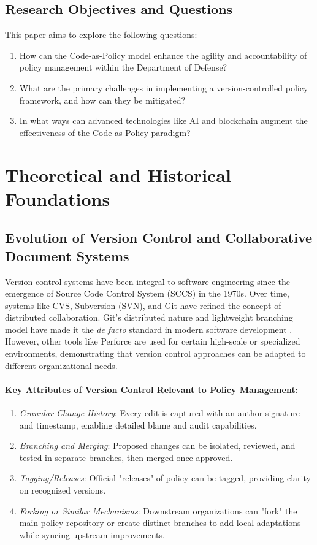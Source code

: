 \documentclass[11pt]{article}
\begin{document}
	\subsection{Research Objectives and Questions}
	This paper aims to explore the following questions:
	\begin{enumerate}
		\item How can the Code-as-Policy model enhance the agility and accountability of policy management within the Department of Defense?
		\item What are the primary challenges in implementing a version-controlled policy framework, and how can they be mitigated?
		\item In what ways can advanced technologies like AI and blockchain augment the effectiveness of the Code-as-Policy paradigm?
	\end{enumerate}

	\section{Theoretical and Historical Foundations}

	\subsection{Evolution of Version Control and Collaborative Document Systems}
	Version control systems have been integral to software engineering since the emergence of Source Code Control System (SCCS) in the 1970s. Over time, systems like CVS, Subversion (SVN), and Git have refined the concept of distributed collaboration. Git's distributed nature and lightweight branching model have made it the \textit{de facto} standard in modern software development \cite{Loeliger2012}. However, other tools like Perforce are used for certain high-scale or specialized environments, demonstrating that version control approaches can be adapted to different organizational needs.

	\paragraph{Key Attributes of Version Control Relevant to Policy Management:}
	\begin{enumerate}
		\item \textit{Granular Change History}: Every edit is captured with an author signature and timestamp, enabling detailed blame and audit capabilities.
		\item \textit{Branching and Merging}: Proposed changes can be isolated, reviewed, and tested in separate branches, then merged once approved.
		\item \textit{Tagging/Releases}: Official "releases" of policy can be tagged, providing clarity on recognized versions.
		\item \textit{Forking or Similar Mechanisms}: Downstream organizations can "fork" the main policy repository or create distinct branches to add local adaptations while syncing upstream improvements.
	\end{enumerate}
\end{document}
